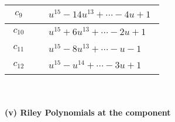 \documentclass[1p]{elsarticle_modified}
\theoremstyle{definition}
\begin{document}
\begin{tabular}{m{50pt}|m{274pt}}
\hline $$\begin{aligned}c_{9}\end{aligned}$$&$\begin{aligned}
&u^{15}-14 u^{13}+\cdots-4 u+1
\end{aligned}$\\
\hline $$\begin{aligned}c_{10}\end{aligned}$$&$\begin{aligned}
&u^{15}+6 u^{13}+\cdots-2 u+1
\end{aligned}$\\
\hline $$\begin{aligned}c_{11}\end{aligned}$$&$\begin{aligned}
&u^{15}-8 u^{13}+\cdots- u-1
\end{aligned}$\\
\hline $$\begin{aligned}c_{12}\end{aligned}$$&$\begin{aligned}
&u^{15}- u^{14}+\cdots-3 u+1
\end{aligned}$\\
\hline
\end{tabular}\\~\\
\newpage\renewcommand{\arraystretch}{1}
\flushleft \textbf{(v) Riley Polynomials at the component}\newline \\
\end{document}
